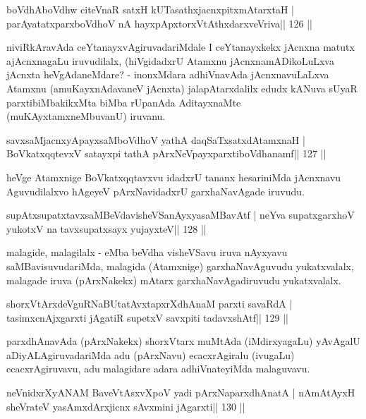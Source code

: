\begin{shl}
boVdhAboVdhw citeVnaR satxH kUTasathxjacnxpitxmAtarxtaH |
parAyatatxparxboVdhoV nA hayxpApxtorxVtAthxdarxveVriva\hfill || 126 ||
\end{shl}

\begin{artha}
niviRkAravAda ceYtanayxvAgiruvadariMdale I ceYtanayxkekx jAcnxna matutx ajAcnxnagaLu iruvudilalx, (hiVgidadxrU Atamxnu jAcnxnamADikoLuLxva jAcnxta heVgAdaneMdare? - inonxMdara adhiVnavAda jAcnxnavuLaLxva Atamxnu (amuKayxnAdavaneV jAcnxta) jalapAtarxdalilx edudx kANuva sUyaR parxtibiMbakikxMta biMba rUpanAda AditayxnaMte (muKAyxtamxneMbuvanU) iruvanu.
\end{artha}

\begin{shl}
savxsaMjacnxyA\s payxsaMboVdhoV yathA daqSaTxsatxdAtamxnaH |
BoVkatxqqtevxV satayxpi tathA pArxNeV\s payxparxtiboVdhanamf\hfill || 127 ||
\end{shl}

\begin{artha}
heVge Atamxnige BoVkatxqqtavxvu idadxrU tananx hesariniMda jAcnxnavu 
Aguvudilalxvo hAgeyeV pArxNavidadxrU garxhaNavAgade iruvudu.
\end{artha} 

\begin{shl}
supAtxsupatxtavxsaMBeVdavisheVSanAyxyasaMBavAtf |
neYva supatxgarxhoV yukotxV na tavxsupatxsayx yujayxteV\hfill || 128 ||
\end{shl}

\begin{artha}
malagide, malagilalx - eMba beVdha visheVSavu iruva nAyxyavu saMBavisuvudariMda, malagida (Atamxnige) garxhaNavAguvudu yukatxvalalx, malagade iruva (pArxNakekx) mAtarx garxhaNavAgadiruvudu yukatxvalalx.
\end{artha}


\begin{shl}
shorxVtArxdeVguRNaBUtatAvxtapxrXdhAnaM parxti savaRdA |
tasimxcnAjxgarxti jAgatiR supetxV savxpiti tadavxshAtf\hfill || 129 ||
\end{shl}

\begin{artha}
parxdhAnavAda (pArxNakekx) shorxVtarx muMtAda (iMdirxyagaLu) yAvAgalU aDiyALAgiruvadariMda adu (pArxNavu) ecacxrAgiralu (ivugaLu) ecacxrAgiruvavu, adu malagidare adara adhiVnateyiMda malaguvavu.
\end{artha}

\begin{shl}
neVnidxrXyANAM BaveVtAsxvXpoV yadi pArxNaparxdhAnatA |
nAmAtAyxH sheVrateV yasAmxdArxjicnx sAvxmini jAgarxti\hfill || 130 ||
\end{shl}

